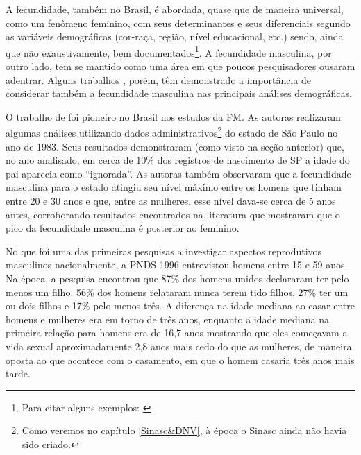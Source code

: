 A fecundidade, também no Brasil, é abordada, quase que de maneira universal, como um fenômeno feminino, com seus determinantes e seus diferenciais segundo as variáveis demográficas (cor-raça, região, nível educacional, etc.) sendo, ainda que não exaustivamente, bem documentados\footnote{Para citar alguns exemplos: \cite{gonccalves2019transiccao,berquo2014notas,wong1984niveis,wong1983fecundidade}}. A fecundidade masculina, por outro lado, tem se mantido como uma área em que poucos pesquisadores ousaram adentrar. Alguns trabalhos \cite{gerber2014two, Caswell2022-zu}, porém, têm demonstrado a importância de considerar também a fecundidade masculina nas principais análises demográficas.

O trabalho de  foi pioneiro no Brasil nos estudos da FM. As autoras realizaram algumas análises utilizando dados administrativos\footnote{Como veremos no capítulo \ref{Sinasc&DNV}, à época o Sinasc ainda não havia sido criado.} do estado de São Paulo no ano de 1983. Seus resultados demonstraram (como visto na seção anterior) que, no ano analisado, em cerca de 10\% dos registros de nascimento de SP a idade do pai aparecia como “ignorada”. As autoras também observaram que a fecundidade masculina para o estado atingiu seu nível máximo entre os homens que tinham entre 20 e 30 anos e que, entre as mulheres, esse nível dava-se cerca de 5 anos antes, corroborando resultados encontrados na literatura que mostraram que o pico da fecundidade masculina é posterior ao feminino.

No que foi uma das primeiras pesquisas a investigar aspectos reprodutivos masculinos nacionalmente, a PNDS 1996 entrevistou homens entre 15 e 59 anos. Na época, a pesquisa encontrou que 87\% dos homens unidos declararam ter pelo menos um filho. 56\% dos homens relataram nunca terem tido filhos, 27\% ter um ou dois filhos e 17\% pelo menos três. A diferença na idade mediana ao casar entre homens e mulheres era em torno de três anos, enquanto a idade mediana na primeira relação para homens era de 16,7 anos mostrando que eles começavam a vida sexual aproximadamente 2,8 anos mais cedo do que as mulheres, de maneira oposta ao que acontece com o casamento, em que o homem casaria três anos mais tarde\cite[Tabela 5.7]{bemfam_brasil_1997}.

